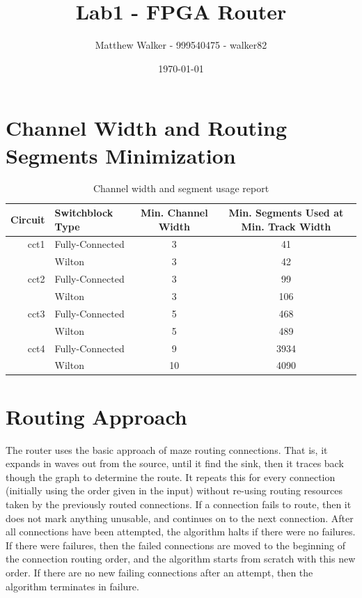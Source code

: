 \documentclass[11pt]{article}
\title{Lab1 - FPGA Router}
\author{Matthew Walker - 999540475 - walker82}
\date{\today}
\begin{document}
\maketitle


\section{Channel Width and Routing Segments Minimization}\label{sec:min}

\begin{table}[h]
\centering
\begin{tabular}{ r | l | c | c }
\hline\hline
Circuit & Switchblock Type & Min. Channel Width & Min. Segments Used at Min. Track Width \\
\hline
cct1 & Fully-Connected &  3 & 41 \\
     & Wilton          &  3 & 42 \\
\hline
cct2 & Fully-Connected &  3 & 99 \\
     & Wilton          &  3 & 106 \\
\hline
cct3 & Fully-Connected &  5 & 468 \\
     & Wilton          &  5 & 489 \\
\hline
cct4 & Fully-Connected &  9 & 3934 \\
     & Wilton          & 10 & 4090 \\
\hline
\hline
\end{tabular}
\caption{Channel width and segment usage report}\label{tab:min}
\end{table}

\section{Routing Approach}
The router uses the basic approach of maze routing connections. That is, it expands in waves out from the source, until it find the sink, then it traces back though the graph to determine the route. It repeats this for every connection (initially using the order given in the input) without re-using routing resources taken by the previously routed connections. If a connection fails to route, then it does not mark anything unusable, and continues on to the next connection. After all connections have been attempted, the algorithm halts if there were no failures. If there were failures, then the failed connections are moved to the beginning of the connection routing order, and the algorithm starts from scratch with this new order. If there are no new failing connections after an attempt, then the algorithm terminates in failure.
\end{document}
